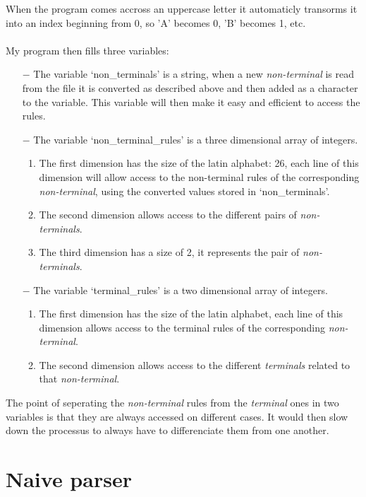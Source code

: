 When the program comes accross an uppercase letter it automaticly transorms it into an index beginning from 0, so 'A' becomes 0, 'B' becomes 1, etc.
\\
\\
My program then fills three variables:
\begin{itemize}
    \item[$-$] The variable `non\_terminals' is a string, when a new \textit{non-terminal} is read from the file it is converted as described above and then added as a character to the variable. This variable will then make it easy and efficient to access the rules.
    \item[$-$] The variable `non\_terminal\_rules' is a three dimensional array of integers.
        \begin{enumerate}
            \item The first dimension has the size of the latin alphabet: 26, each line of this dimension will allow access to the non-terminal rules of the corresponding \textit{non-terminal}, using the converted values stored in `non\_terminals'.
            \item The second dimension allows access to the different pairs of \textit{non-terminals}.
            \item The third dimension has a size of 2, it represents the pair of \textit{non-terminals}.
        \end{enumerate}
    \item[$-$] The variable `terminal\_rules' is a two dimensional array of integers.
        \begin{enumerate}
        \item The first dimension has the size of the latin alphabet, each line of this dimension allows access to the terminal rules of the corresponding \textit{non-terminal}.
        \item The second dimension allows access to the different \textit{terminals} related to that \textit{non-terminal}.
        \end{enumerate}
\end{itemize}

The point of seperating the \textit{non-terminal} rules from the \textit{terminal} ones in two variables is that they are always accessed on different cases. It would then slow down the processus to always have to differenciate them from one another.

\section{Naive parser}

